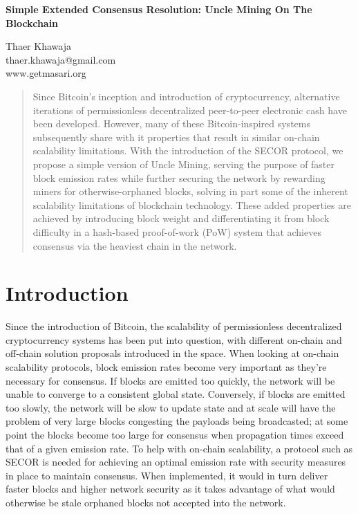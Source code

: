 \documentclass{article}
\begin{document}
\begin{center}
  \textbf{Simple Extended Consensus Resolution: Uncle Mining On The Blockchain}\\
  \vspace{5mm}

  {\small
    Thaer Khawaja\\
    thaer.khawaja@gmail.com\\
    www.getmasari.org\\
  }
  \vspace{5mm}
\end{center}

\begin{abstract}
  Since Bitcoin's inception and introduction of cryptocurrency\cite{nakamoto}, alternative iterations of permissionless decentralized peer-to-peer electronic cash have been developed. However, many of these Bitcoin-inspired systems subsequently share with it properties that result in similar on-chain scalability limitations. With the introduction of the SECOR protocol, we propose a simple version of Uncle Mining, serving the purpose of faster block emission rates while further securing the network by rewarding miners for otherwise-orphaned blocks, solving in part some of the inherent scalability limitations of blockchain technology. These added properties are achieved by introducing block weight and differentiating it from block difficulty in a hash-based proof-of-work (PoW) system that achieves consensus via the heaviest chain in the network.
\end{abstract}

\section{Introduction}
Since the introduction of Bitcoin, the scalability of permissionless decentralized cryptocurrency systems has been put into question, with different on-chain and off-chain solution proposals introduced in the space. When looking at on-chain scalability protocols, block emission rates become very important as they're necessary for consensus. If blocks are emitted too quickly, the network will be unable to converge to a consistent global state. Conversely, if blocks are emitted too slowly, the network will be slow to update state and at scale will have the problem of very large blocks congesting the payloads being broadcasted; at some point the blocks become too large for consensus when propagation times exceed that of a given emission rate. To help with on-chain scalability, a protocol such as SECOR is needed for achieving an optimal emission rate with security measures in place to maintain consensus. When implemented, it would in turn deliver faster blocks and higher network security as it takes advantage of what would otherwise be stale orphaned blocks not accepted into the network.
\end{document}
